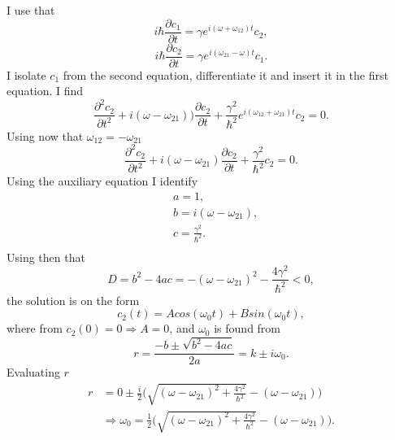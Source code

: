 \begin{example}
\begin{enumerate}
		I use that
		\begin{equation}
			i\hbar\frac{\partial c_1}{\partial t}=\gamma e^{i(\omega+\omega_{12}) t}c_2,
		\end{equation} 
		\begin{equation}
			i\hbar\frac{\partial c_2}{\partial t}=\gamma e^{i(\omega_{21}-\omega) t}c_1.
			\label{eq28}
		\end{equation} 
		I isolate $c_1$ from the second equation, differentiate it and insert it in the first equation. I find
		\begin{equation}
			\frac{\partial^2 c_2}{\partial t^2}+i(\omega-\omega_{21}))\frac{\partial c_2}{\partial t}+\frac{\gamma^2}{\hbar^2} e^{i(\omega_{12}+\omega_{21})t}c_2=0.
		\end{equation} 
		Using now that $\omega_{12}=-\omega_{21}$
		\begin{equation}
			\frac{\partial^2 c_2}{\partial t^2}+i(\omega-\omega_{21})\frac{\partial c_2}{\partial t}+\frac{\gamma^2}{\hbar^2}c_2=0.
		\end{equation} 
		Using the auxiliary equation I identify
		\begin{equation}
			\begin{split}
				&a=1,\\
				&b=i(\omega-\omega_{21}),\\
				&c=\frac{\gamma^2}{\hbar^2}.\\
			\end{split}
		\end{equation} 
		Using then that
		\begin{equation}
			D=b^2-4ac=-(\omega-\omega_{21})^2-\frac{4\gamma^2}{\hbar^2}<0,
		\end{equation} 
		the solution is on the form
		\begin{equation}
			c_2(t)=Acos(\omega_0t)+Bsin(\omega_0t),
		\end{equation} 
		where from $c_2(0)=0\Rightarrow A=0$, and $\omega_0$ is found from
		\begin{equation}
			r=\frac{-b\pm\sqrt{b^2-4ac}}{2a}=k\pm i\omega_0.
		\end{equation} 
		Evaluating $r$
		\begin{equation}
			\begin{split}
				r&=0\pm\frac{i}{2}\bigg(\sqrt{(\omega-\omega_{21})^2+\frac{4\gamma^2}{\hbar^2}}-(\omega-\omega_{21})\bigg)\\
				&\Rightarrow \omega_0=\frac{1}{2}\bigg(\sqrt{(\omega-\omega_{21})^2+\frac{4\gamma^2}{\hbar^2}}-(\omega-\omega_{21})\bigg).
			\end{split}

\end{equation}
\end{enumerate}
\end{example}
